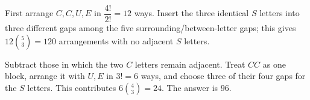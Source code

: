 First arrange $C,C,U,E$ in $\dfrac{4!}{2!}=12$ ways. Insert the three identical $S$ letters into three different gaps among the five surrounding/between-letter gaps; this gives $12\binom53=120$ arrangements with no adjacent $S$ letters.

Subtract those in which the two $C$ letters remain adjacent. Treat $CC$ as one block, arrange it with $U,E$ in $3!=6$ ways, and choose three of their four gaps for the $S$ letters. This contributes $6\binom43=24$. The answer is $\boxed{96}$.
